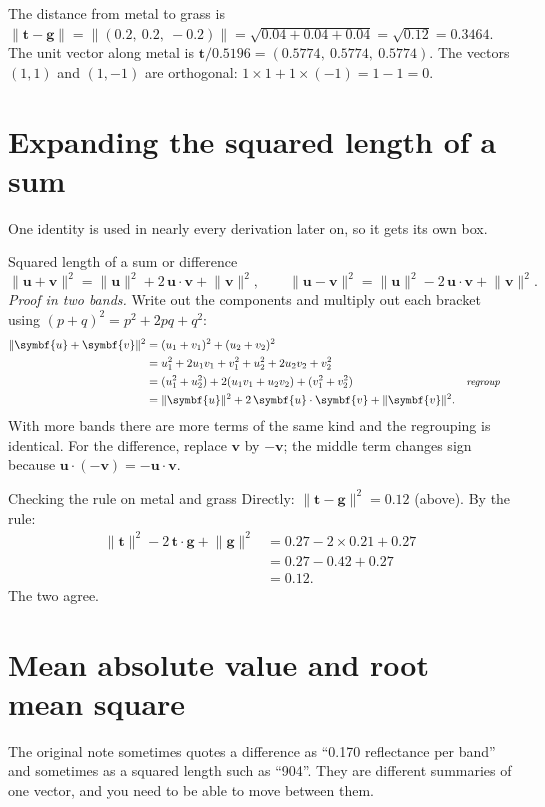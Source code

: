 \documentclass[11pt,a4paper,oneside,openany]{book}
\newcommand{\B}[1]{{\symbf{#1}}}
\newcommand{\B}[1]{{\bm{#1}}}
\newcommand{\nrm}[1]{\lVert #1\rVert}
\newcommand{\vt}{\B{t}}
\newcommand{\vu}{\B{u}}
\newcommand{\vv}{\B{v}}
\newcommand{\vg}{\B{g}}
\newcommand{\why}[1]{&&\text{\small\itshape #1}}
\begin{document}
The distance from metal to grass is $\nrm{\vt-\vg}=\nrm{(0.2,\ 0.2,\ -0.2)}=\sqrt{0.04+0.04+0.04}=\sqrt{0.12}=0.3464$.
The unit vector along metal is $\vt/0.5196=(0.5774,\ 0.5774,\ 0.5774)$. The vectors $(1,1)$ and $(1,-1)$ are orthogonal:
$1\times1+1\times(-1)=1-1=0$.

\section{Expanding the squared length of a sum}

One identity is used in nearly every derivation later on, so it gets its own box.

\begin{rulebox}[label=rule:expand]{Squared length of a sum or difference}
\[
  \nrm{\vu+\vv}^2=\nrm{\vu}^2+2\,\vu\cdot\vv+\nrm{\vv}^2,\qquad
  \nrm{\vu-\vv}^2=\nrm{\vu}^2-2\,\vu\cdot\vv+\nrm{\vv}^2 .
\]
\emph{Proof in two bands.} Write out the components and multiply out each bracket using $(p+q)^2=p^2+2pq+q^2$:
\begin{align*}
\nrm{\vu+\vv}^2 &= (u_1+v_1)^2+(u_2+v_2)^2\\
 &= u_1^2+2u_1v_1+v_1^2+u_2^2+2u_2v_2+v_2^2\\
 &= (u_1^2+u_2^2)+2(u_1v_1+u_2v_2)+(v_1^2+v_2^2) \why{regroup}\\
 &= \nrm{\vu}^2+2\,\vu\cdot\vv+\nrm{\vv}^2 .
\end{align*}
With more bands there are more terms of the same kind and the regrouping is identical. For the difference, replace
$\vv$ by $-\vv$; the middle term changes sign because $\vu\cdot(-\vv)=-\vu\cdot\vv$.
\end{rulebox}

\begin{worked}[label=we:expand]{Checking the rule on metal and grass}
Directly: $\nrm{\vt-\vg}^2=0.12$ (above). By the rule:
\begin{align*}
\nrm{\vt}^2-2\,\vt\cdot\vg+\nrm{\vg}^2 &= 0.27-2\times0.21+0.27\\
 &= 0.27-0.42+0.27\\
 &= 0.12 .
\end{align*}
The two agree.
\end{worked}

\section{Mean absolute value and root mean square}

The original note sometimes quotes a difference as ``0.170 reflectance per band'' and sometimes as a squared length such as
``904''. They are different summaries of one vector, and you need to be able to move between them.
\end{document}
